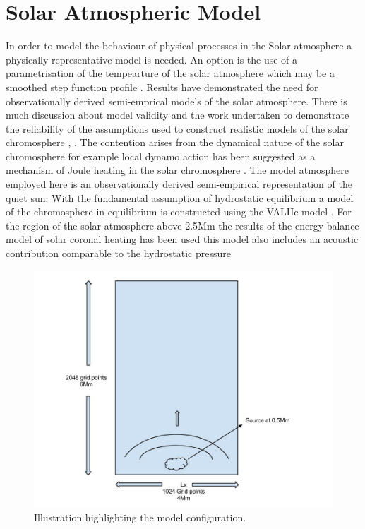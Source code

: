 \documentclass{aa}
\begin{document}
\section{Solar Atmospheric Model}
In order to model the behaviour of physical processes in the Solar atmosphere a physically representative model is needed. An option is the use of a parametrisation of the tempearture of the solar atmosphere which may be a smoothed step function profile  \cite{Murawski2010}. Results have demonstrated the need for observationally derived semi-emprical models of the solar atmosphere. There is much discussion about model validity and the work undertaken to demonstrate the reliability of the assumptions used to construct realistic models of the solar chromosphere \cite{Carlsson1995}, \cite{Kalkofen2012}. The contention arises from the dynamical nature of the solar chromosphere for example local dynamo action has been suggested as a mechanism of Joule heating in the solar chromosphere \cite{Leenaarts2011}. The model atmosphere employed here is an observationally derived semi-empirical representation of the quiet sun. With the fundamental assumption of hydrostatic equilibrium a model of the chromosphere in equilibrium is constructed using the VALIIc model \cite{Vernazza1981}. For the region of the solar atmosphere above 2.5Mm the results of the energy balance model of solar coronal heating has been used this model also includes an acoustic contribution comparable to the hydrostatic pressure \cite{McWhirter1975}


\begin{figure}[h]
\includegraphics[scale=0.5]{images/solarmodel_fig1.jpg}
\caption{Illustration highlighting the model configuration. }
\end{figure}
\end{document}
